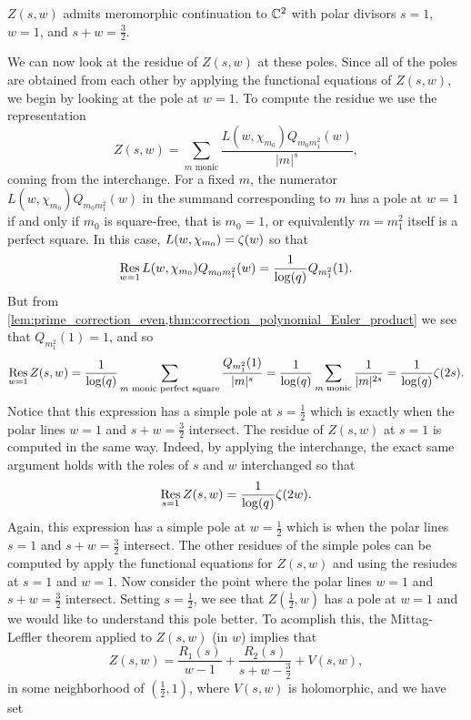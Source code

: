 \documentclass[12pt,reqno,oneside]{amsart}
\begin{document}
    \begin{theorem}
        $Z(s,w)$ admits meromorphic continuation to $\mathbb{C}^{2}$ with polar divisors $s = 1$, $w = 1$, and $s+w = \frac{3}{2}$.
    \end{theorem}

    We can now look at the residue of $Z(s,w)$ at these poles. Since all of the poles are obtained from each other by applying the functional equations of $Z(s,w)$, we begin by looking at the pole at $w = 1$. To compute the residue we use the representation
    \[
        Z(s,w) = \sum_{\text{$m$ monic}}\frac{L(w,\chi_{m_{0}})Q_{m_{0}m_{1}^{2}}(w)}{|m|^{s}},
    \]
    coming from the interchange. For a fixed $m$, the numerator $L(w,\chi_{m_{0}})Q_{m_{0}m_{1}^{2}}(w)$ in the summand corresponding to $m$ has a pole at $w = 1$ if and only if $m_{0}$ is square-free, that is $m_{0} = 1$, or equivalently $m = m_{1}^{2}$ itself is a perfect square. In this case, $L(w,\chi_{m_{0}}) = \zeta(w)$ so that
    \[
        \operatorname*{\mathrm{Res}}_{w = 1}L(w,\chi_{m_{0}})Q_{m_{0}m_{1}^{2}}(w) = \frac{1}{\log(q)}Q_{m_{1}^{2}}(1).
    \]
    But from \cref{lem:prime_correction_even,thm:correction_polynomial_Euler_product} we see that $Q_{m_{1}^{2}}(1) = 1$, and so
    \[
        \operatorname*{\mathrm{Res}}_{w = 1}Z(s,w) = \frac{1}{\log(q)}\sum_{\text{$m$ monic perfect square}}\frac{Q_{m_{1}^{2}}(1)}{|m|^{s}} = \frac{1}{\log(q)}\sum_{\text{$m$ monic}}\frac{1}{|m|^{2s}} = \frac{1}{\log(q)}\zeta(2s).
    \]
    Notice that this expression has a simple pole at $s = \frac{1}{2}$ which is exactly when the polar lines $w = 1$ and $s+w = \frac{3}{2}$ intersect. The residue of $Z(s,w)$ at $s = 1$ is computed in the same way. Indeed, by applying the interchange, the exact same argument holds with the roles of $s$ and $w$ interchanged so that
    \[
        \operatorname*{\mathrm{Res}}_{s = 1}Z(s,w) = \frac{1}{\log(q)}\zeta(2w).
    \]
    Again, this expression has a simple pole at $w = \frac{1}{2}$ which is when the polar lines $s = 1$ and $s+w = \frac{3}{2}$ intersect. The other residues of the simple poles can be computed by apply the functional equations for $Z(s,w)$ and using the resiudes at $s = 1$ and $w = 1$. Now consider the point where the polar lines $w = 1$ and $s+w = \frac{3}{2}$ intersect. Setting $s = \frac{1}{2}$, we see that $Z\left(\frac{1}{2},w\right)$ has a pole at $w= 1$ and we would like to understand this pole better. To acomplish this, the Mittag-Leffler theorem applied to $Z(s,w)$ (in $w$) implies that
    \[
        Z(s,w) = \frac{R_{1}(s)}{w-1}+\frac{R_{2}(s)}{s+w-\frac{3}{2}}+V(s,w),
    \]
    in some neighborhood of $\left(\frac{1}{2},1\right)$, where $V(s,w)$ is holomorphic, and we have set
\end{document}
